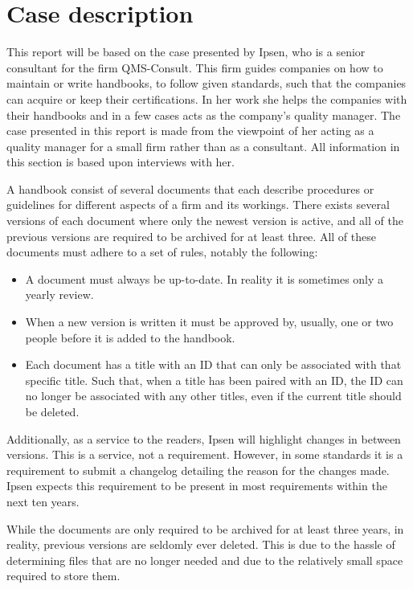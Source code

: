 \section{Case description} \label{sec:CaseDescription}

This report will be based on the case presented by Ipsen, who is a senior consultant for the firm QMS-Consult.
This firm guides companies on how to maintain or write handbooks, to follow given standards, such that the companies can acquire or keep their certifications.
In her work she helps the companies with their handbooks and in a few cases acts as the company's quality manager.
The case presented in this report is made from the viewpoint of her acting as a quality manager for a small firm rather than as a consultant.
All information in this section is based upon interviews with her.

A handbook consist of several documents that each describe procedures or guidelines for different aspects of a firm and its workings.
There exists several versions of each document where only the newest version is active, and all of the previous versions are required to be archived for at least three.
All of these documents must adhere to a set of rules, notably the following:

\begin{itemize}
	\item
	A document must always be up-to-date.
	In reality it is sometimes only a yearly review.
	\item
	When a new version is written it must be approved by, usually, one or two people before it is added to the handbook.
	\item
	Each document has a title with an ID that can only be associated with that specific title.
	Such that, when a title has been paired with an ID, the ID can no longer be associated with any other titles, even if the current title should be deleted.
\end{itemize}

Additionally, as a service to the readers, Ipsen will highlight changes in between versions.
This is a service, not a requirement.
However, in some standards it is a requirement to submit a changelog detailing the reason for the changes made.
Ipsen expects this requirement to be present in most requirements within the next ten years.

While the documents are only required to be archived for at least three years, in reality, previous versions are seldomly ever deleted.
This is due to the hassle of determining files that are no longer needed and due to the relatively small space required to store them.

